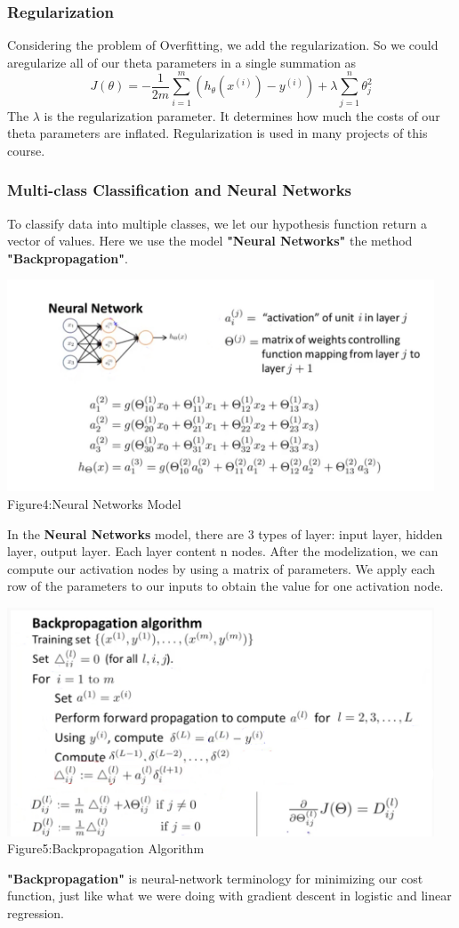 \documentclass[a4paper]{article}
\begin{document}
{\subsubsection{\textbf{Regularization}}
 Considering the problem of Overfitting, we add the regularization. So we could aregularize all of our theta parameters in a single summation as$$J(\theta)=-\frac{1}{2m}\sum_{i=1}^{m}(h_\theta(x^{(i)})-y^{(i)})+\lambda\sum_{j=1}^n\theta_j^2$$
The $\lambda$ is the regularization parameter. It determines how much the costs of our theta parameters are inflated.
Regularization is used in many projects of this course.
\subsubsection{\textbf{Multi-class Classification and Neural Networks}}
To classify data into multiple classes, we let our hypothesis function return a vector of values. Here we use the model \textbf{"Neural Networks"} the method \textbf{"Backpropagation"}.
\begin{center}
\includegraphics[width=5in]{nn.png}\\
Figure4:Neural Networks Model
\end{center}
In the \textbf{Neural Networks} model, there are 3 types of layer: input layer, hidden layer, output layer. Each layer content n nodes. After the modelization, we can compute our activation nodes by using a matrix of parameters. We apply each row of the parameters to our inputs to obtain the value for one activation node.\\
\begin{center}
\includegraphics[width=5in]{back.png}\\
Figure5:Backpropagation Algorithm
\end{center}
\textbf{"Backpropagation"} is neural-network terminology for minimizing our cost function, just like what we were doing with gradient descent in logistic and linear regression. 

}
\end{document}
